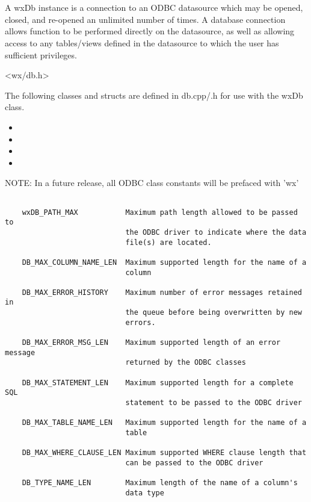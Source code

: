 \section{}\label{wxdb}

A wxDb instance is a connection to an ODBC datasource which may
be opened, closed, and re-opened an unlimited number of times.  A
database connection allows function to be performed directly on the
datasource, as well as allowing access to any tables/views defined in
the datasource to which the user has sufficient privileges.



<wx/db.h>



The following classes and structs are defined in db.cpp/.h for use with the wxDb class.

\begin{itemize}\itemsep=0pt
\item {}
\item {}
\item {}
\item {}
\end{itemize}



NOTE: In a future release, all ODBC class constants will be prefaced with 'wx'

\begin{verbatim}

    wxDB_PATH_MAX           Maximum path length allowed to be passed to
                            the ODBC driver to indicate where the data 
                            file(s) are located.

    DB_MAX_COLUMN_NAME_LEN  Maximum supported length for the name of a 
                            column

    DB_MAX_ERROR_HISTORY    Maximum number of error messages retained in 
                            the queue before being overwritten by new 
                            errors.

    DB_MAX_ERROR_MSG_LEN    Maximum supported length of an error message 
                            returned by the ODBC classes

    DB_MAX_STATEMENT_LEN    Maximum supported length for a complete SQL 
                            statement to be passed to the ODBC driver

    DB_MAX_TABLE_NAME_LEN   Maximum supported length for the name of a 
                            table

    DB_MAX_WHERE_CLAUSE_LEN Maximum supported WHERE clause length that 
                            can be passed to the ODBC driver

    DB_TYPE_NAME_LEN        Maximum length of the name of a column's 
                            data type
\end{verbatim}


